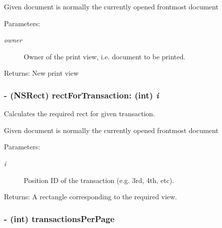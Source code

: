 Given document is normally the currently opened frontmost document \begin{Desc}
\item[Parameters:]
\begin{description}
\item[{\em owner}]Owner of the print view, i.e. document to be printed. \end{description}
\end{Desc}
\begin{Desc}
\item[Returns:]New print view \end{Desc}
\hypertarget{interface_z_x_print_transaction_view_7f719de4df038472fe764489e782605c}{
\subsubsection[{rectForTransaction:}]{\setlength{\rightskip}{0pt plus 5cm}- (NSRect) rectForTransaction: (int) {\em i}}}
\label{interface_z_x_print_transaction_view_7f719de4df038472fe764489e782605c}


Calculates the required rect for given transaction. 

Given document is normally the currently opened frontmost document \begin{Desc}
\item[Parameters:]
\begin{description}
\item[{\em i}]Position ID of the transaction (e.g. 3rd, 4th, etc). \end{description}
\end{Desc}
\begin{Desc}
\item[Returns:]A rectangle corresponding to the required view. \end{Desc}
\hypertarget{interface_z_x_print_transaction_view_d60b05e1c3fb49619c603ae70489f422}{
\subsubsection[{transactionsPerPage}]{\setlength{\rightskip}{0pt plus 5cm}- (int) transactionsPerPage }}
\label{interface_z_x_print_transaction_view_d60b05e1c3fb49619c603ae70489f422}


